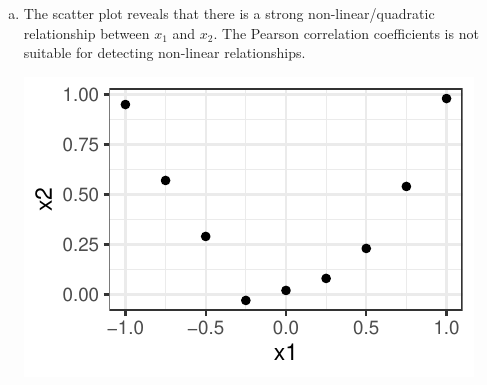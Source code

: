 {\begin{enumerate}[a)]
  \item  The scatter plot reveals that there is a strong non-linear/quadratic relationship between $x_1$ and $x_2$. The Pearson correlation coefficients is not suitable
  for detecting non-linear relationships.
  
\begin{center}
\includegraphics[width=\maxwidth]{figure/add_Points_x1_x2_sol.pdf}
\end{center}
 
  
\end{enumerate}
}
